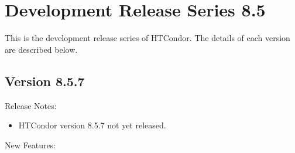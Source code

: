 
\section{\label{sec:History-8-5}Development Release Series 8.5}

This is the development release series of HTCondor.
The details of each version are described below.

\subsection*{\label{sec:New-8-5-7}Version 8.5.7}

\noindent Release Notes:

\begin{itemize}

\item HTCondor version 8.5.7 not yet released.

\end{itemize}


\noindent New Features:

